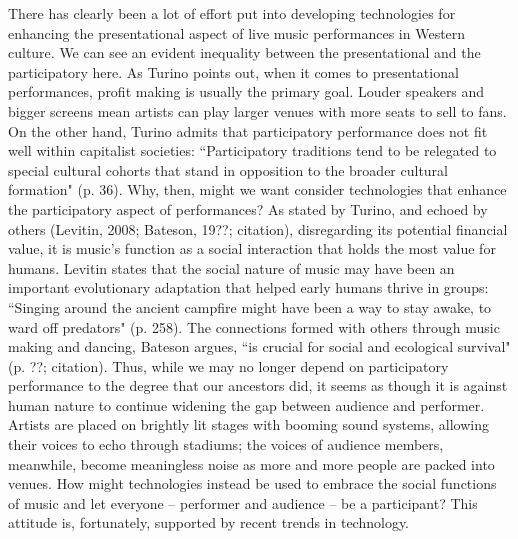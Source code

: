 There has clearly been a lot of effort put into developing technologies for enhancing the presentational aspect of live music performances in Western culture. We can see an evident inequality between the presentational and the participatory here. As Turino points out, when it comes to presentational performances, profit making is usually the primary goal. Louder speakers and bigger screens mean artists can play larger venues with more seats to sell to fans. On the other hand, Turino admits that participatory performance does not fit well within capitalist societies: ``Participatory traditions tend to be relegated to special cultural cohorts that stand in opposition to the broader cultural formation" (p. 36). Why, then, might we want consider technologies that enhance the participatory aspect of performances? As stated by Turino, and echoed by others (Levitin, 2008; Bateson, 19??; citation), disregarding its potential financial value, it is music's function as a social interaction that holds the most value for humans. Levitin states that the social nature of music may have been an important evolutionary adaptation that helped early humans thrive in groups: ``Singing around the ancient campfire might have been a way to stay awake, to ward off predators" (p. 258). The connections formed with others through music making and dancing, Bateson argues, ``is crucial for social and ecological survival" (p. ??; citation). Thus, while we may no longer depend on participatory performance to the degree that our ancestors did, it seems as though it is against human nature to continue widening the gap between audience and performer. Artists are placed on brightly lit stages with booming sound systems, allowing their voices to echo through stadiums; the voices of audience members, meanwhile, become meaningless noise as more and more people are packed into venues. How might technologies instead be used to embrace the social functions of music and let everyone -- performer and audience -- be a participant? This attitude is, fortunately, supported by recent trends in technology.

